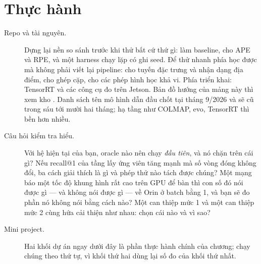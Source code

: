 \documentclass[../../deep_learning.tex]{subfiles}
\begin{document}
\section{Thực hành}
\begin{description}
\item[Repo và tài nguyên.] Dựng lại nền so sánh trước khi thử bất cứ thứ gì:  làm baseline,  cho APE và RPE, và một harness chạy lặp có ghi seed. Để thử nhanh phía học được mà không phải viết lại pipeline:  cho tuyến đặc trưng và nhận dạng địa điểm,  cho ghép cặp,  cho các phép hình học khả vi. Phía triển khai: TensorRT và các công cụ đo trên Jetson. Bản đồ hướng của mảng này thì xem kho . Danh sách tên mô hình dẫn đầu chốt tại tháng 9/2026 và sẽ cũ trong sáu tới mười hai tháng; hạ tầng như COLMAP, evo, TensorRT thì bền hơn nhiều.
\item[Câu hỏi kiểm tra hiểu.] Với hệ hiện tại của bạn, oracle nào nên chạy \emph{đầu tiên}, và nó chặn trên cái gì? Nếu recall@1 của tầng lấy ứng viên tăng mạnh mà số vòng đóng không đổi, ba cách giải thích là gì và phép thử nào tách được chúng? Một mạng báo một tốc độ khung hình rất cao trên GPU để bàn thì con số đó nói được gì --- và không nói được gì --- về Orin ở batch bằng 1, và bạn sẽ đo phần nó không nói bằng cách nào? Một can thiệp mức 1 và một can thiệp mức 2 cùng hứa cải thiện như nhau: chọn cái nào và vì sao?
\item[Mini project.] Hai khối dự án ngay dưới đây là phần thực hành chính của chương; chạy chúng theo thứ tự, vì khối thứ hai dùng lại số đo của khối thứ nhất.
\end{description}
\end{document}
